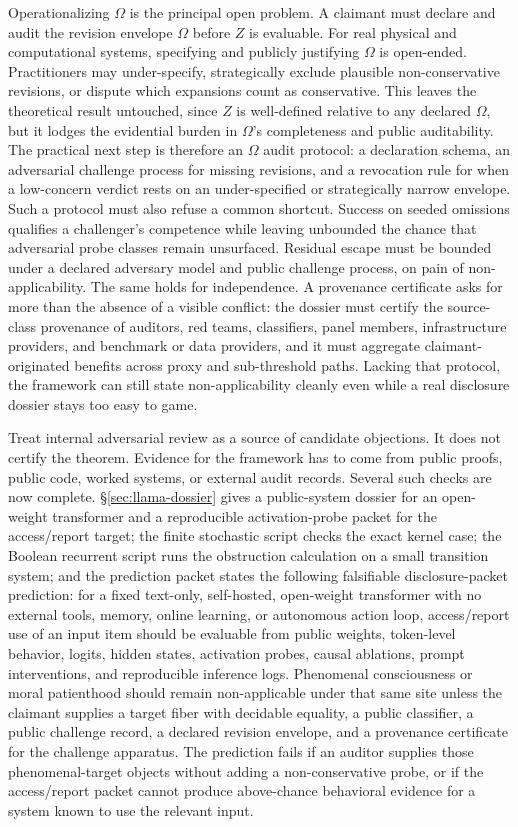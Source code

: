 \documentclass[11pt]{article}
\begin{document}
Operationalizing $\Omega$ is the principal open problem. A claimant
must declare and audit the revision envelope $\Omega$ before $Z$ is evaluable.
For real physical and computational systems, specifying and publicly
justifying $\Omega$ is open-ended.
Practitioners may under-specify, strategically exclude plausible
non-conservative revisions, or dispute which expansions count as conservative.
This leaves the theoretical result untouched, since $Z$ is well-defined relative
to any declared $\Omega$, but it lodges the evidential burden in $\Omega$'s
completeness and public auditability. The practical next step is therefore an
$\Omega$ audit protocol: a declaration schema, an adversarial challenge process
for missing revisions, and a revocation rule for when a low-concern verdict
rests on an under-specified or strategically narrow envelope. Such a protocol
must also refuse a common shortcut. Success on seeded omissions qualifies a
challenger's competence while leaving unbounded the chance that adversarial
probe classes remain unsurfaced. Residual escape must be bounded under a declared
adversary model and public challenge process, on pain of non-applicability. The
same holds for independence. A provenance certificate asks for more than the
absence of a visible conflict: the dossier must certify the source-class
provenance of auditors, red teams, classifiers, panel members, infrastructure
providers, and benchmark or data providers, and it must aggregate
claimant-originated benefits across proxy and sub-threshold paths. Lacking that
protocol, the framework can still state non-applicability cleanly even while a
real disclosure dossier stays too easy to game.

Treat internal adversarial review as a source of candidate objections. It does
not certify the theorem. Evidence for the framework has to come from public
proofs, public code, worked systems, or external audit records. Several such
checks are now complete.
\S\ref{sec:llama-dossier} gives a public-system dossier for an open-weight
transformer and a reproducible activation-probe packet for the access/report
target;
the finite stochastic script checks the exact kernel case;
the Boolean recurrent script runs the obstruction calculation on a small
transition system; and
the prediction packet states the following falsifiable disclosure-packet
prediction: for a fixed text-only, self-hosted, open-weight transformer with no
external tools, memory, online learning, or autonomous action loop,
access/report use of an input item should be evaluable from public weights,
token-level behavior, logits, hidden states, activation probes, causal
ablations, prompt interventions, and reproducible inference logs. Phenomenal
consciousness or moral patienthood should remain non-applicable under that
same site unless the claimant supplies a target fiber with decidable equality,
a public classifier, a public challenge record, a declared revision envelope,
and a provenance certificate for the challenge apparatus. The prediction fails
if an auditor supplies those phenomenal-target objects without adding a
non-conservative probe, or if the access/report packet cannot produce
above-chance behavioral evidence for a system known to use the relevant input.
\end{document}
